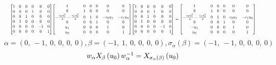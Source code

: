 \documentclass[11pt]{article}
\theoremstyle{definition}
\begin{document}
\[
\scaletoalign{\textwidth}{{\left[\begin{matrix}1 & 0 & 0 & 0 & 0 & 0\\0 & 0 & 0 & 1 & 0 & 0\\0 & 0 & 1 & 0 & 0 & 0\\0 & 1 & 0 & 0 & 0 & 0\\0 & 0 & 0 & 0 & -1 & 0\\0 & 0 & 0 & 0 & 0 & 1\end{matrix}\right]} {\left[\begin{matrix}1 & 0 & 0 & 0 & 0 & 0\\0 & 1 & 0 & 0 & 0 & 0\\- \frac{c_{0} u_{1}^{2}}{2} - \frac{c_{1} u_{0}^{2}}{2} & 0 & 1 & 0 & - c_{0} u_{1} & - c_{1} u_{0}\\0 & 0 & 0 & 1 & 0 & 0\\u_{1} & 0 & 0 & 0 & 1 & 0\\u_{0} & 0 & 0 & 0 & 0 & 1\end{matrix}\right]} {\left[\begin{matrix}1 & 0 & 0 & 0 & 0 & 0\\0 & 0 & 0 & 1 & 0 & 0\\0 & 0 & 1 & 0 & 0 & 0\\0 & 1 & 0 & 0 & 0 & 0\\0 & 0 & 0 & 0 & -1 & 0\\0 & 0 & 0 & 0 & 0 & 1\end{matrix}\right]} = {\left[\begin{matrix}1 & 0 & 0 & 0 & 0 & 0\\0 & 1 & 0 & 0 & 0 & 0\\- \frac{c_{0} u_{1}^{2}}{2} - \frac{c_{1} u_{0}^{2}}{2} & 0 & 1 & 0 & c_{0} u_{1} & - c_{1} u_{0}\\0 & 0 & 0 & 1 & 0 & 0\\- u_{1} & 0 & 0 & 0 & 1 & 0\\u_{0} & 0 & 0 & 0 & 0 & 1\end{matrix}\right]}}
\]
\[
\alpha = \left( 0, \  -1, \  0, \  0, \  0, \  0\right), \beta = \left( -1, \  1, \  0, \  0, \  0, \  0\right), \sigma_{\alpha}(\beta) = \left( -1, \  -1, \  0, \  0, \  0, \  0\right)
\]
\[
\scaletoalign{\textwidth}{w_{\alpha} X_{\beta}\left(u_{0}\right) w_{\alpha}^{-1} = X_{\sigma_{\alpha}\left(\beta\right)}\left(u_{0}\right)}
\]
\end{document}
